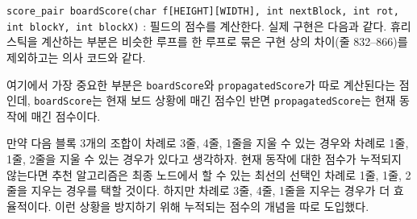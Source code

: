 \texttt{score_pair boardScore(char f[HEIGHT][WIDTH], int nextBlock, int rot, int blockY, int blockX)}
: 필드의 점수를 계산한다. 실제 구현은 다음과 같다. 휴리스틱을 계산하는 부분은 비슷한 루프를 한 루프로 묶은 구현 상의 차이(줄 832--866)를
제외하고는 의사 코드와 같다.

여기에서 가장 중요한 부분은 \texttt{boardScore}와 \texttt{propagatedScore}가 따로 계산된다는 점인데, \texttt{boardScore}는 현재 보드
상황에 매긴 점수인 반면 \texttt{propagatedScore}는 현재 동작에 매긴 점수이다.

만약 다음 블록 3개의 조합이 차례로 3줄, 4줄, 1줄을 지울 수 있는 경우와 차례로 1줄, 1줄, 2줄을 지울 수 있는 경우가 있다고 생각하자.
현재 동작에 대한 점수가 누적되지 않는다면 추천 알고리즘은 최종 노드에서 할 수 있는 최선의 선택인 차례로 1줄, 1줄, 2줄을 지우는 경우를 택할 것이다.
하지만 차례로 3줄, 4줄, 1줄을 지우는 경우가 더 효율적이다. 이런 상황을 방지하기 위해 누적되는 점수의 개념을 따로 도입했다.